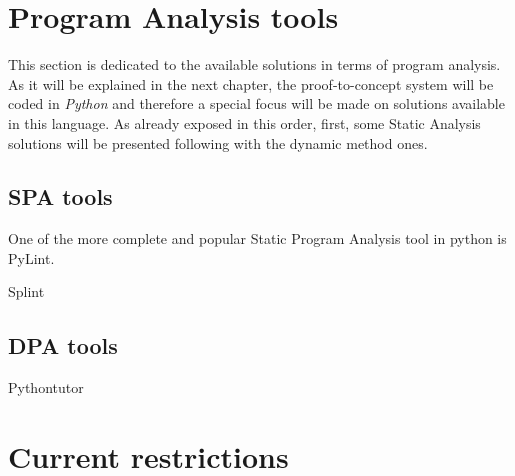 \section{Program Analysis tools}
This section is dedicated to the available solutions in terms of program analysis. As it will be explained in the next chapter, the proof-to-concept system will be coded in \textit{Python} and therefore a special focus will be made on solutions available in this language. As already exposed in this order, first, some Static Analysis solutions will be presented following with the dynamic method ones. 

\subsection{SPA tools}
One of the more complete and popular Static Program Analysis tool in python is PyLint.

Splint

\subsection{DPA tools}

Pythontutor


\section{Current restrictions}
